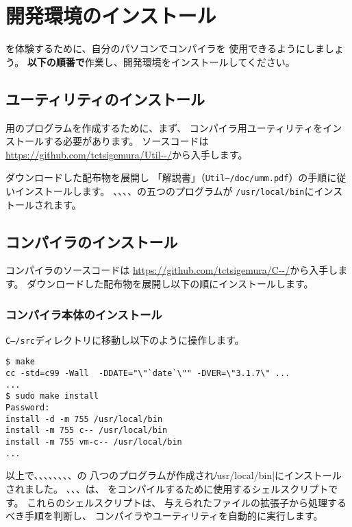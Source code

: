 % 
%
\chapter{\cmml 開発環境のインストール}

\cmml を体験するために、自分のパソコンで\cmm コンパイラを
使用できるようにしましょう。
{\bf 以下の順番で}作業し、開発環境をインストールしてください。


\section{ユーティリティのインストール}

{\tac}用のプログラムを作成するために、まず、
{\cmm}コンパイラ用ユーティリティをインストールする必要があります。
ソースコードは
\url{https://github.com/tctsigemura/Util--/}から入手します。

ダウンロードした配布物を展開し
「{\util}解説書」（{\tt Util--/doc/umm.pdf}）の手順に従いインストールします。
{\as}、{\ld}、{\objbin}、{\objexe}、{\size}の五つのプログラムが
{\tt /usr/local/bin}にインストールされます。

\section{コンパイラのインストール}
\label{chap2:compilerl}

{\cmm}コンパイラのソースコードは
\url{https://github.com/tctsigemura/C--/}から入手します。
ダウンロードした配布物を展開し以下の順にインストールします。

\subsection{コンパイラ本体のインストール}

{\tt C--/src}ディレクトリに移動し以下のように操作します。

\begin{mylist}
\begin{verbatim}
$ make
cc -std=c99 -Wall  -DDATE="\"`date`\"" -DVER=\"3.1.7\" ...
...
$ sudo make install
Password:
install -d -m 755 /usr/local/bin
install -m 755 c-- /usr/local/bin
install -m 755 vm-c-- /usr/local/bin
...
\end{verbatim}
\end{mylist}

以上で、{\cme}、{\cmc}、{\cmi}、{\cmv}、{\cmmc}、{\ccmmc}、{\icmmc}、{\vcmmc}の
八つのプログラムが作成され\|/usr/local/bin|にインストールされました。
{\cme}、{\cmc}、{\cmi}、{\cmv}は、
{\cmml}をコンパイルするために使用するシェルスクリプトです。
これらのシェルスクリプトは、
与えられたファイルの拡張子から処理するべき手順を判断し、
コンパイラやユーティリティを自動的に実行します。

